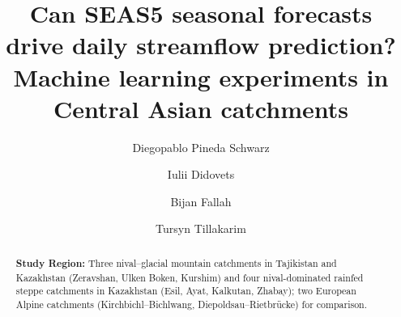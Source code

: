 \documentclass[review,12pt,authoryear]{elsarticle}
\begin{document}
\linenumbers

\begin{frontmatter}



\title{Can SEAS5 seasonal forecasts drive daily streamflow prediction? Machine learning experiments in Central Asian catchments} %

\author[1]{Diegopablo Pineda Schwarz}
\author[1]{Iulii Didovets}
\author[1]{Bijan Fallah}
\author[2]{Tursyn Tillakarim}





\begin{abstract}

\textbf{Study Region:} Three nival--glacial mountain catchments in Tajikistan and Kazakhstan (Zeravshan, Ulken Boken, Kurshim) and four nival-dominated rainfed steppe catchments in Kazakhstan (Esil, Ayat, Kalkutan, Zhabay); two European Alpine catchments (Kirchbichl--Bichlwang, Diepoldsau--Rietbr\"ucke) for comparison.


\end{abstract}
\end{frontmatter}
\end{document}
